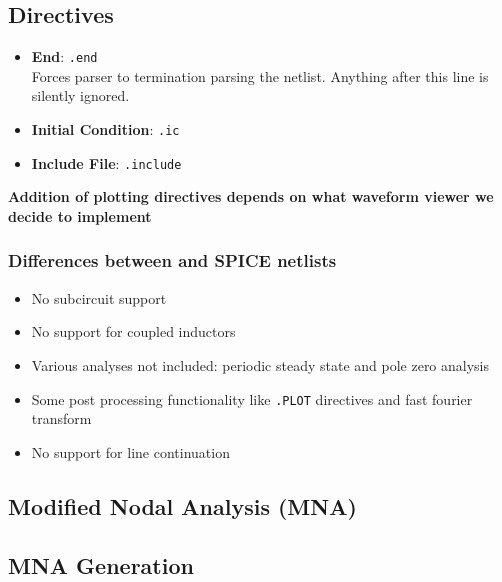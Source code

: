 \subsection*{Directives}

\begin{itemize}
    \item \textbf{End}: \texttt{.end}\\
    Forces parser to termination parsing the netlist. Anything after this line is silently ignored.
    \item \textbf{Initial Condition}: \texttt{.ic}
    \item \textbf{Include File}: \texttt{.include}
\end{itemize}

\textbf{Addition of plotting directives depends on what waveform viewer we decide to implement}
\subsubsection*{Differences between \turmeric and SPICE netlists}
\begin{itemize}
    \item No subcircuit support
    \item No support for coupled inductors
    \item Various analyses not included: periodic steady state and pole zero analysis
    \item Some post processing functionality like \texttt{.PLOT} directives and fast fourier transform
    \item No support for line continuation
\end{itemize}

\subsection{Modified Nodal Analysis (MNA)}

\subsection{MNA Generation}